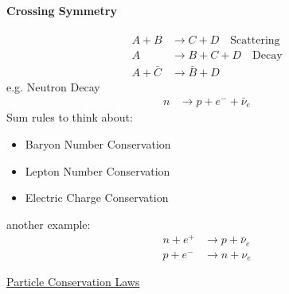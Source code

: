 \documentclass[../main.tex]{subfiles}
\begin{document}
\paragraph{Crossing Symmetry}
\begin{align*}
    A + B &\rightarrow C + D \quad \textrm{Scattering} \\
    A &\rightarrow B + C + D \quad \textrm{Decay} \\
    A + \bar C &\rightarrow \bar B + D
\end{align*}
e.g. Neutron Decay
\begin{align*}
    n &\rightarrow p + e^- + \bar \nu_e 
\end{align*}
Sum rules to think about:
\begin{itemize}
    \item Baryon Number Conservation
    \item Lepton Number Conservation
    \item Electric Charge Conservation
\end{itemize}
another example:
\begin{align*}
    n + e^+ &\rightarrow p + \bar \nu_e \\
    p + e^- &\rightarrow n + \nu_e
\end{align*}

\href{https://phys.libretexts.org/Bookshelves/University_Physics/University_Physics_(OpenStax)/University_Physics_III_-_Optics_and_Modern_Physics_(OpenStax)/11%3A_Particle_Physics_and_Cosmology/11.03%3A_Particle_Conservation_Laws}{Particle Conservation Laws}

\newpage
\end{document}
